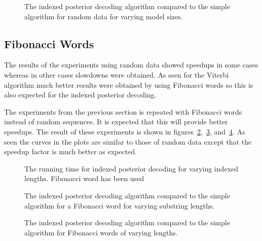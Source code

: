 \begin{figure}
  \centering
  
  \caption{The indexed posterior decoding algorithm compared to the simple
    algorithm for random data for varying model sizes.}
  \label{fig:indexed_posterior_speedup_vs_N}
\end{figure}

\subsection{Fibonacci Words}

The results of the experiments using random data showed speedups in some cases
whereas in other cases slowdowns were obtained. As seen for the Viterbi
algorithm much better results were obtained by using Fibonacci words so this
is also expected for the indexed posterior decoding.

The experiments from the previous section is repeated with Fibonacci words
instead of random sequences. It is expected that this will provide better
speedups. The result of these experiments is shown in
figures~\ref{fig:assymptotic_indexed_posterior_fib_subseq_length.tex},~\ref{fig:fib_indexed_posterior_speedup_vs_subseq},
and~\ref{fig:indexed_posterior_fib_speedup_vs_T}. As seen the curves in the
plots are similar to those of random data except that the speedup factor is
much better as expected.

\begin{figure}
  \centering
  
  \caption{The running time for indexed posterior decoding for
    varying indexed lengths. Fibonacci word has been used}
  \label{fig:assymptotic_indexed_posterior_fib_subseq_length.tex}
\end{figure}

\begin{figure}
  \centering
  
  \caption{The indexed posterior decoding algorithm compared to the simple
    algorithm for a Fibonacci word for varying substring lengths.}
  \label{fig:fib_indexed_posterior_speedup_vs_subseq}
\end{figure}

\begin{figure}
  \centering
  
  \caption{The indexed posterior decoding algorithm compared to the simple
    algorithm for Fibonacci words of varying lengths.}
  \label{fig:indexed_posterior_fib_speedup_vs_T}
\end{figure}

